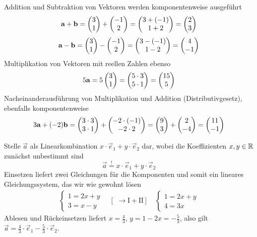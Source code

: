 \documentclass[11pt]{scrartcl}
\begin{document}
\begin{solution}
  \begin{subex}
  \item Addition und Subtraktion von Vektoren werden komponentenweise ausgeführt
  \[
    \mathbf{a} + \mathbf{b} = \begin{pmatrix} 3 \\ 1 \end{pmatrix} + \begin{pmatrix} -1 \\ 2 \end{pmatrix} = \begin{pmatrix} 3 + (-1) \\ 1 + 2 \end{pmatrix} = \begin{pmatrix} 2 \\ 3 \end{pmatrix}
  \]
  \[
    \mathbf{a} - \mathbf{b} = \begin{pmatrix} 3 \\ 1 \end{pmatrix} - \begin{pmatrix} -1 \\ 2 \end{pmatrix} = \begin{pmatrix} 3 - (-1) \\ 1 - 2 \end{pmatrix} = \begin{pmatrix} 4 \\ -1 \end{pmatrix}
  \]
  Multiplikation von Vektoren mit reellen Zahlen ebenso
  \[
    5 \mathbf{a} = 5 \begin{pmatrix} 3 \\ 1 \end{pmatrix} = \begin{pmatrix} 5 \cdot 3 \\ 5 \cdot 1 \end{pmatrix} = \begin{pmatrix} 15 \\ 5 \end{pmatrix}
  \]
  Nacheinanderausführung von Multiplikation und Addition (Distributivgesetz), ebenfalls komponentenweise
  \[
    3 \mathbf{a} + (-2) \mathbf{b} = \begin{pmatrix} 3 \cdot 3 \\ 3 \cdot 1 \end{pmatrix} + \begin{pmatrix} -2 \cdot (-1) \\ -2 \cdot 2 \end{pmatrix}
    = \begin{pmatrix} 9 \\ 3 \end{pmatrix} + \begin{pmatrix} 2 \\ -4 \end{pmatrix} = \begin{pmatrix} 11 \\ -1 \end{pmatrix}
  \]

  \item Stelle $\vec{a}$ als Linearkombination $x\cdot \vec{e}_1 + y\cdot \vec{e}_2$ dar, wobei die Koeffizienten $x,y \in \mathbb{R}$ zunächst unbestimmt sind
  \[
    \vec{a} \stackrel{!}{=} x \cdot \vec{e}_1 + y \cdot \vec{e}_2
  \]
  Einsetzen liefert zwei Gleichungen für die Komponenten und somit ein lineares Gleichungssystem, das wir wie gewohnt lösen
  \begin{align*}
    \left\{ \begin{array}{l}1 = 2x + y \\  3 = x - y \end{array} \right. \quad [\,\,\rightarrow \mathrm{I + II}] \quad \left\{ \begin{array}{l}1 = 2x + y  \\  4 = 3x \end{array} \right.
  \end{align*}
  Ablesen und Rückeinsetzen liefert $x = \frac{4}{3}$, $y = 1 - 2x = -\frac{5}{3}$, also gilt $\vec{a} = \frac{4}{3}\cdot\vec{e}_1 - \frac{5}{3}\cdot \vec{e}_2$.
  \end{subex}
\end{solution}
\end{document}
